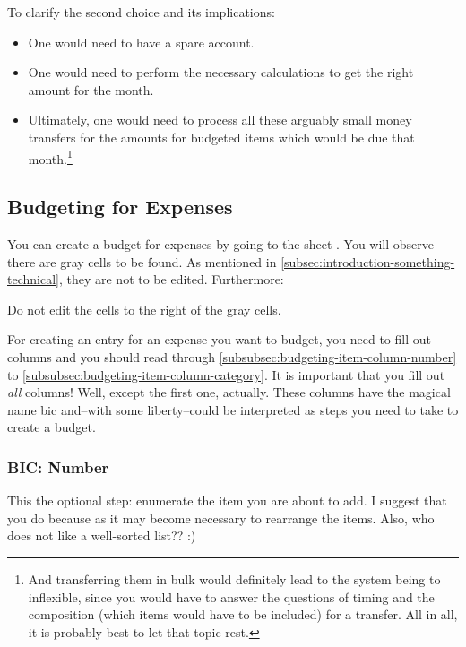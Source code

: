 To clarify the second choice and its implications:
\begin{itemize}
	\item One would need to have a spare account.
	\item One would need to perform the necessary calculations to get the right amount for the month.
	\item Ultimately, one would need to process all these arguably small money transfers for the amounts for budgeted items which would be due that month.\footnote{And transferring them in bulk would definitely lead to the system being to inflexible, since you would have to answer the questions of timing and the composition (which items would have to be included) for a transfer.
	All in all, it is probably best to let that topic rest.}
\end{itemize}

\subsection{Budgeting for Expenses}
\label{subsec:budgeting-expenses}

You can create a budget for expenses by going to the sheet .
You will observe there are gray cells to be found.
As mentioned in \autoref{subsec:introduction-something-technical}, they are not to be edited.
Furthermore:
\begin{center}\sffamily
	Do not edit the cells to the right of the gray cells.
\end{center}

For creating an entry for an expense you want to budget, you need to fill out columns and you should read through \autoref{subsubsec:budgeting-item-column-number} to \autoref{subsubsec:budgeting-item-column-category}.
It is important that you fill out \emph{all} columns!
Well, except the first one, actually.
These columns have the magical name \ac{bic} and--with some liberty--could be interpreted as steps you need to take to create a budget.

\subsubsection{BIC: Number}
\label{subsubsec:budgeting-item-column-number}

This the optional step: enumerate the item you are about to add.
I suggest that you do because as it may become necessary to rearrange the items.
Also, who does not like a well-sorted list?? :)

